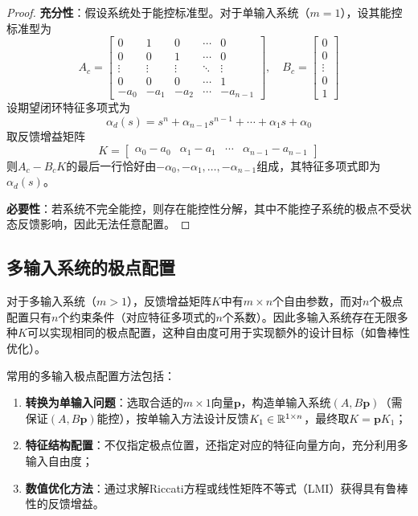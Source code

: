 \begin{proof}
\textbf{充分性}：假设系统处于能控标准型。对于单输入系统（$m=1$），设其能控标准型为
\[
A_c = \begin{bmatrix}
0 & 1 & 0 & \cdots & 0 \\
0 & 0 & 1 & \cdots & 0 \\
\vdots & \vdots & \vdots & \ddots & \vdots \\
0 & 0 & 0 & \cdots & 1 \\
-a_0 & -a_1 & -a_2 & \cdots & -a_{n-1}
\end{bmatrix},\quad
B_c = \begin{bmatrix} 0 \\ 0 \\ \vdots \\ 0 \\ 1 \end{bmatrix}
\]
设期望闭环特征多项式为
\[
\alpha_d(s) = s^n + \alpha_{n-1}s^{n-1} + \cdots + \alpha_1 s + \alpha_0
\]
取反馈增益矩阵
\[
K = \begin{bmatrix} \alpha_0 - a_0 & \alpha_1 - a_1 & \cdots & \alpha_{n-1} - a_{n-1} \end{bmatrix}
\]
则$A_c - B_cK$的最后一行恰好由$-\alpha_0, -\alpha_1, \dots, -\alpha_{n-1}$组成，其特征多项式即为$\alpha_d(s)$。

\textbf{必要性}：若系统不完全能控，则存在能控性分解，其中不能控子系统的极点不受状态反馈影响，因此无法任意配置。
\end{proof}

\subsection{多输入系统的极点配置}

对于多输入系统（$m > 1$），反馈增益矩阵$K$中有$m \times n$个自由参数，而对$n$个极点配置只有$n$个约束条件（对应特征多项式的$n$个系数）。因此多输入系统存在无限多种$K$可以实现相同的极点配置，这种自由度可用于实现额外的设计目标（如鲁棒性优化）。

常用的多输入极点配置方法包括：
\begin{enumerate}
\item \textbf{转换为单输入问题}：选取合适的$m \times 1$向量$\mathbf{p}$，构造单输入系统$(A, B\mathbf{p})$（需保证$(A, B\mathbf{p})$能控），按单输入方法设计反馈$K_1 \in \mathbb{R}^{1 \times n}$，最终取$K = \mathbf{p}K_1$；
\item \textbf{特征结构配置}：不仅指定极点位置，还指定对应的特征向量方向，充分利用多输入自由度；
\item \textbf{数值优化方法}：通过求解Riccati方程或线性矩阵不等式（LMI）获得具有鲁棒性的反馈增益。
\end{enumerate}

